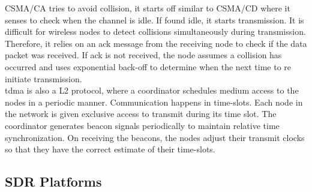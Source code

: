 \ac{CSMA/CA} tries to avoid collision, it starts off similar to \ac{CSMA/CD} where it senses to check when the channel is idle.
If found idle, it starts transmission.
It is difficult for wireless nodes to detect collisions simultaneously during transmission.
Therefore, it relies on an \ac{ack} message from the receiving node to check if the data packet was received.
If \ac{ack} is not received, the node assumes a collision has occurred and  uses exponential back-off to determine when the next time to re initiate transmission.\\


\ac{tdma} is also a \ac{L2} protocol, where a coordinator schedules medium access to the nodes in a periodic manner.
Communication happens in time-slots.
Each node in the network is given exclusive access to transmit during its time slot.
The coordinator generates beacon signals periodically to maintain relative time synchronization. On receiving the beacons, the nodes adjust their transmit clocks so that they have the correct estimate of their time-slots.
 
 

\subsection{SDR Platforms}

